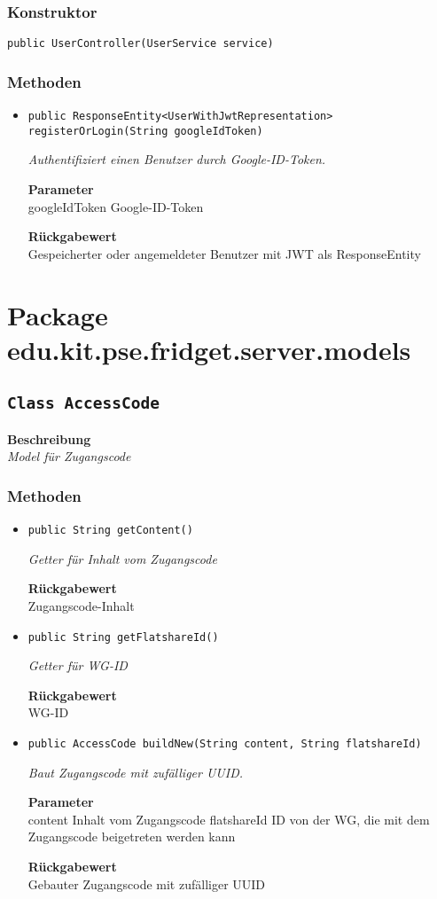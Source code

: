     \subsubsection{Konstruktor}
    \texttt{public UserController(UserService service)}
    \subsubsection{Methoden}
    \begin{itemize}
    	\item{\texttt{public ResponseEntity<UserWithJwtRepresentation> registerOrLogin(String googleIdToken)}}
    	
    	\textit{Authentifiziert einen Benutzer durch Google-ID-Token.}
    	
    	\textbf{Parameter} \\
    	googleIdToken Google-ID-Token
    	
    	\textbf{Rückgabewert} \\
    	Gespeicherter oder angemeldeter Benutzer mit JWT als ResponseEntity
    \end{itemize}
    \section{Package edu.kit.pse.fridget.server.models}
    \subsection{\texttt{Class AccessCode}}
    \textbf{Beschreibung} \\
    \textit{Model für Zugangscode}
    \subsubsection{Methoden}
    \begin{itemize}
    	\item{\texttt{public String getContent()}}
    	
    	\textit{Getter für Inhalt vom Zugangscode}
    	
    	
    	
    	\textbf{Rückgabewert} \\
    	Zugangscode-Inhalt        \item{\texttt{public String getFlatshareId()}}
    	
    	\textit{Getter für WG-ID}
    	
    	
    	
    	\textbf{Rückgabewert} \\
    	WG-ID        \item{\texttt{public AccessCode buildNew(String content, String flatshareId)}}
    	
    	\textit{Baut Zugangscode mit zufälliger UUID.}
    	
    	\textbf{Parameter} \\
    	content Inhalt vom Zugangscode
    	flatshareId ID von der WG, die mit dem Zugangscode beigetreten werden kann
    	
    	\textbf{Rückgabewert} \\
    	Gebauter Zugangscode mit zufälliger UUID
    \end{itemize}
